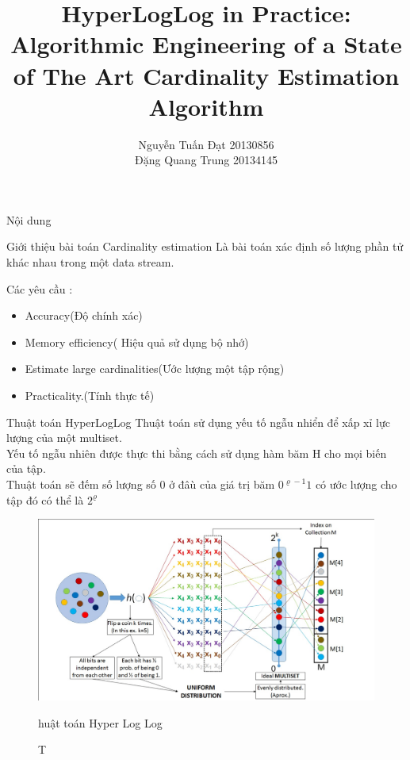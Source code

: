 \documentclass{beamer}
\title[]{{\bf \large HyperLogLog in Practice: Algorithmic Engineering of a
State of The Art Cardinality Estimation Algorithm } \\
}
\author[]{
Nguyễn Tuấn Đạt 20130856\\%
Đặng Quang Trung 20134145%
}
\institute[]{

}
\begin{document}
\begin{frame}
\titlepage
\end{frame}

\begin{frame}{Nội dung}
\tableofcontents
\end{frame}
\begin{frame}{Giới thiệu bài toán Cardinality estimation }
Là bài toán xác định số lượng phần tử khác nhau trong một data stream. 

Các yêu cầu :
\begin{itemize}
\item Accuracy(Độ chính xác)
\item Memory efficiency( Hiệu quả sử dụng bộ nhớ)
\item Estimate large cardinalities(Ước lượng một tập rộng)
\item Practicality.(Tính thực tế)
\end{itemize}

\end{frame}
\begin{frame}{Thuật toán HyperLogLog}
Thuật toán sử dụng yếu tố ngẫu nhiển để xấp xỉ lực lượng của một multiset.\\
Yếu tố ngẫu nhiên được thực thi bằng cách sử dụng hàm băm H cho mọi biến của tập.\\
Thuật toán sẽ đếm số lượng số 0 ở đâù của giá trị băm $ 0^{\varrho-1} 1 $ có ước lượng cho tập đó có thể là $ 2^\varrho$ 
\end{frame}
\begin{frame}
\begin{figure}[h]
\includegraphics[scale=0.2]{HLL.png}
\caption Thuật toán Hyper Log Log
\end{figure}
\end{frame}
\end{document}
